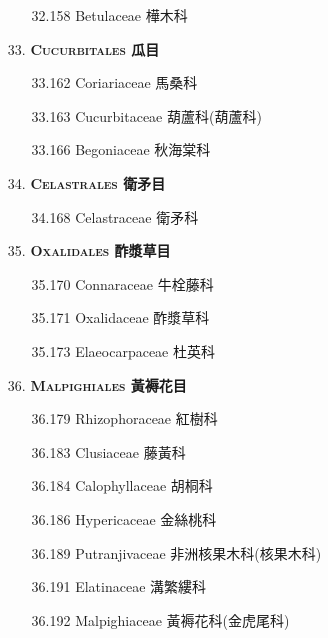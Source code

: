 \begin{enumerate}
\begin{enumerate}
      \item[32.158] Betulaceae 樺木科  
        
    \end{enumerate}
  \item[33. ] \textbf{\textsc{Cucurbitales} 瓜目} 
    \begin{enumerate}
      \item[33.162] Coriariaceae 馬桑科  
        
      \item[33.163] Cucurbitaceae 葫蘆科(葫蘆科)  
        
      \item[33.166] Begoniaceae 秋海棠科  
        
    \end{enumerate}
  \item[34. ] \textbf{\textsc{Celastrales} 衛矛目} 
    \begin{enumerate}
      \item[34.168] Celastraceae 衛矛科  
        
    \end{enumerate}
  \item[35. ] \textbf{\textsc{Oxalidales} 酢漿草目} 
    \begin{enumerate}
      \item[35.170] Connaraceae 牛栓藤科  
        
      \item[35.171] Oxalidaceae 酢漿草科  
        
      \item[35.173] Elaeocarpaceae 杜英科  
        
    \end{enumerate}
  \item[36. ] \textbf{\textsc{Malpighiales} 黃褥花目} 
    \begin{enumerate}
      \item[36.179] Rhizophoraceae 紅樹科  
        
      \item[36.183] Clusiaceae 藤黃科  
        
      \item[36.184] Calophyllaceae 胡桐科  
        
      \item[36.186] Hypericaceae 金絲桃科  
        
      \item[36.189] Putranjivaceae 非洲核果木科(核果木科)  
        
      \item[36.191] Elatinaceae 溝繁縷科  
        
      \item[36.192] Malpighiaceae 黃褥花科(金虎尾科)  

\end{enumerate}
\end{enumerate}
